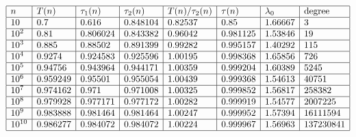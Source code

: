 \documentclass[11pt]{article}
\theoremstyle{definition}
\theoremstyle{remark}
\numberwithin{equation}{section}
\begin{document}
\begin{table}[h]
$$\begin{array}{|l|l|l|l|l|l|l|l|}
\hline
n & T(n) & \tau_1(n) & \tau_2(n) & T(n)/\tau_2(n) & \tau(n) & \lambda_0 & \text{degree}\\
\hline 
10 &  0.7 & 0.616 & 0.848104 & 0.82537 & 0.85 & 1.66667 & 3\\
\hline
10^2 & 0.81 & 0.806024 & 0.843382 & 0.96042 & 0.981125 & 1.53846 & 19\\
\hline
10^3 & 0.885 & 0.88502 & 0.891399 & 0.99282 & 0.995157 & 1.40292 & 115\\
\hline
10^4 & 0.9274 & 0.924583 & 0.925596 & 1.00195 & 0.998368 & 1.65856 & 726\\
\hline
10^5 & 0.94756 & 0.943964 & 0.944171 & 1.00359 & 0.999204 & 1.60389 & 5245\\
\hline
10^6 & 0.959249 & 0.95501 & 0.955054 & 1.00439 & 0.999368 & 1.54613 & 40751\\
\hline
10^7 & 0.974162 & 0.971 & 0.971008 & 1.00325 & 0.999852 & 1.56817 & 258382\\
\hline 
10^8 & 0.979928 & 0.977171 & 0.977172 & 1.00282 & 0.999919 & 1.54577 & 2007225\\
\hline
10^9 & 0.983888 & 0.981464 & 0.981464 & 1.00247 & 0.999952 & 1.57394 & 16111594\\
\hline
10^{10} & 0.986277 & 0.984072 & 0.984072 & 1.00224 & 0.999967 & 1.56963 & 137230841\\
\hline
\end{array}$$
\caption{Values of $T(n)$, $\tau_1(n),\tau_2(n),\tau(n)$, $\lambda_0$ and degree$(x)$ for $x=12n+2$.}\label{tabtetan2}
\end{table}

\newpage
\end{document}

